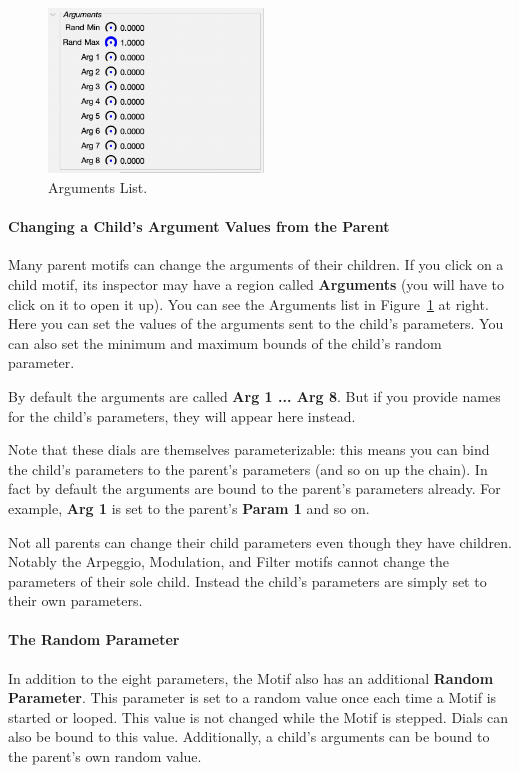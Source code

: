 \documentclass[twoside,10pt]{article}
\begin{document}
\begin{figure}
\includegraphics[width=2.25in]{arguments}
\caption{Arguments List.}
\label{arguments}
\end{figure}

\paragraph{Changing a Child's Argument Values from the Parent} Many parent motifs can change the arguments of their children.  If you click on a child motif, its inspector may have a region called {\bf Arguments} (you will have to click on it to open it up).  You can see the Arguments list in Figure~\ref{arguments} at right.  Here you can set the values of the arguments sent to the child's parameters.  You can also set the minimum and maximum bounds of the child's random parameter.   

By default the arguments are called {\bf Arg 1 ... Arg 8}.  But if you provide names for the child's parameters, they will appear here instead.  

Note that these dials are themselves parameterizable: this means you can bind the child's parameters to the parent's parameters (and so on up the chain).  In fact by default the arguments are bound to the parent's parameters already.  For example, {\bf Arg 1} is set to the parent's {\bf Param 1} and so on.

Not all parents can change their child parameters even though they have children.  Notably the Arpeggio, Modulation, and Filter motifs cannot change the parameters of their sole child.  Instead the child's parameters are simply set to their own parameters.  

\paragraph{The Random Parameter} In addition to the eight parameters, the Motif also has an additional {\bf Random Parameter}.  This parameter is set to a random value once each time a Motif is started or looped.  This value is not changed while the Motif is stepped.  Dials can also be bound to this value.  Additionally, a child's arguments can be bound to the parent's own random value.
\end{document}
